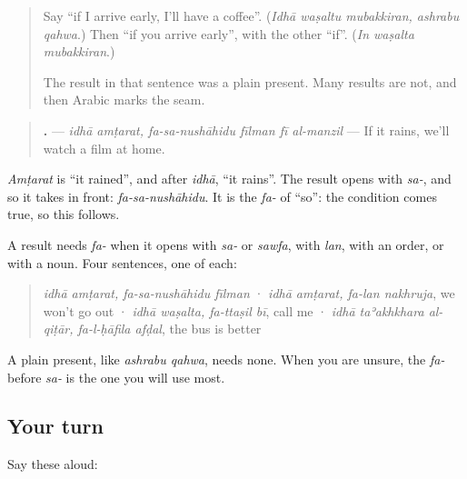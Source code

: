 \begin{quote}
Say \textquotedblleft{}if I arrive early, I'll have a coffee\textquotedblright{}. (\emph{Idhā waṣaltu mubakkiran, ashrabu qahwa}.) Then \textquotedblleft{}if you arrive early\textquotedblright{}, with the other \textquotedblleft{}if\textquotedblright{}. (\emph{In waṣalta mubakkiran}.)

The result in that sentence was a plain present. Many results are not, and then Arabic marks the seam.
\end{quote}

\begin{grammarlens}[title={Grammar Lens: fa- before the result}]
\begin{quote}
\textbf{     .} — \emph{idhā amṭarat, fa-sa-nushāhidu fīlman fī al-manzil} — If it rains, we'll watch a film at home.
\end{quote}

\emph{Amṭarat} is \textquotedblleft{}it rained\textquotedblright{}, and after \emph{idhā}, \textquotedblleft{}it rains\textquotedblright{}. The result opens with \emph{sa-}, and so it takes \textbf{} in front: \emph{fa-sa-nushāhidu}. It is the \emph{fa-} of \textquotedblleft{}so\textquotedblright{}: the condition comes true, so this follows.
\end{grammarlens}

\begin{grammarlens}[title={Grammar Lens: four results that take fa-}]
A result needs \emph{fa-} when it opens with \emph{sa-} or \emph{sawfa}, with \emph{lan}, with an order, or with a noun. Four sentences, one of each:

\begin{quote}
\emph{idhā amṭarat, fa-sa-nushāhidu fīlman} · \emph{idhā amṭarat, fa-lan nakhruja}, we won't go out · \emph{idhā waṣalta, fa-ttaṣil bī}, call me · \emph{idhā taʾakhkhara al-qiṭār, fa-l-ḥāfila afḍal}, the bus is better
\end{quote}

A plain present, like \emph{ashrabu qahwa}, needs none. When you are unsure, the \emph{fa-} before \emph{sa-} is the one you will use most.
\end{grammarlens}

\subsection*{Your turn}
Say these aloud:

